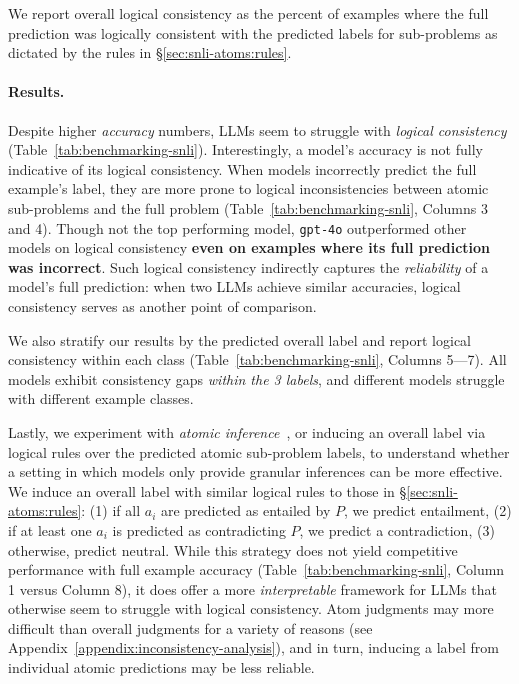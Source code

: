 We report overall logical consistency as the percent of examples where the full prediction was logically consistent with the predicted labels for sub-problems as dictated by the rules in \S\ref{sec:snli-atoms:rules}.

\paragraph{Results.} Despite higher \textit{accuracy} numbers, LLMs seem to struggle with \textit{logical consistency} (Table~\ref{tab:benchmarking-snli}).
%
Interestingly, a model's accuracy is not fully indicative of its logical consistency. 
%
When models incorrectly predict the full example's label, they are more prone to logical inconsistencies between atomic sub-problems and the full problem (Table~\ref{tab:benchmarking-snli}, Columns 3 and 4).
%
Though not the top performing model, \texttt{gpt-4o} outperformed other models on logical consistency \textbf{even on examples where its full prediction was incorrect}.
%
Such logical consistency indirectly captures the \textit{reliability} of a model's full prediction: when two LLMs achieve similar accuracies, logical consistency serves as another point of comparison.

We also stratify our results by the predicted overall label and report logical consistency within each class (Table~\ref{tab:benchmarking-snli}, Columns 5---7). 
%
All models exhibit consistency gaps \textit{within the 3 labels}, and different models struggle with different example classes.

Lastly, we experiment with \textit{atomic inference}~\cite{stacey-etal-2024-atomic}, or inducing an overall label via logical rules over the predicted atomic sub-problem labels, to understand whether a setting in which models only provide granular inferences can be more effective.
%
We induce an overall label with similar logical rules to those in \S\ref{sec:snli-atoms:rules}: (1) if all $a_i$ are predicted as entailed by $P$, we predict entailment, (2) if at least one $a_i$ is predicted as contradicting $P$, we predict a contradiction, (3) otherwise, predict neutral.
%
While this strategy does not yield competitive performance with full example accuracy (Table~\ref{tab:benchmarking-snli}, Column 1 versus Column 8), it does offer a more \textit{interpretable} framework for LLMs that otherwise seem to struggle with logical consistency.
%
Atom judgments may more difficult than overall judgments for a variety of reasons (see Appendix~\ref{appendix:inconsistency-analysis}), and in turn, inducing a label from individual atomic predictions may be less reliable.

